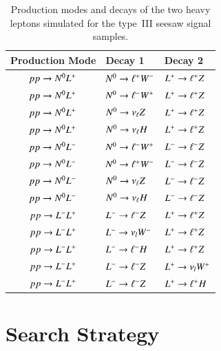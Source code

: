 \begin{table}
	\centering
	\begin{tabular}{c|ll}
		Production Mode & Decay 1 & Decay 2 \\
		\hline
		$pp \rightarrow N^{0}L^{+}$	&	$N^{0} \rightarrow \ell^{+} W^{-}$	&	$L^{+} \rightarrow \ell^{+} Z$ \\
		$pp \rightarrow N^{0}L^{+}$	&	$N^{0} \rightarrow \ell^{-} W^{+}$	&	$L^{+} \rightarrow \ell^{+} Z$ \\
		$pp \rightarrow N^{0}L^{+}$	&	$N^{0} \rightarrow \nu_{\ell} Z$		&	$L^{+} \rightarrow \ell^{+} Z$ \\
		$pp \rightarrow N^{0}L^{+}$	&	$N^{0} \rightarrow \nu_{\ell} H$		&	$L^{+} \rightarrow \ell^{+} Z$ \\
		$pp \rightarrow N^{0}L^{-}$	&	$N^{0} \rightarrow \ell^{-} W^{+}$	&	$L^{-} \rightarrow \ell^{-} Z$ \\
		$pp \rightarrow N^{0}L^{-}$	&	$N^{0} \rightarrow \ell^{+} W^{-}$	&	$L^{-} \rightarrow \ell^{-} Z$ \\
		$pp \rightarrow N^{0}L^{-}$	&	$N^{0} \rightarrow \nu_{\ell} Z$		&	$L^{-} \rightarrow \ell^{-} Z$ \\
		$pp \rightarrow N^{0}L^{-}$	&	$N^{0} \rightarrow \nu_{\ell} H$		&	$L^{-} \rightarrow \ell^{-} Z$ \\
		$pp \rightarrow L^{-}L^{+}$	&	$L^{-} \rightarrow \ell^{-} Z$		&	$L^{+} \rightarrow \ell^{+} Z$ \\
		$pp \rightarrow L^{-}L^{+}$	&	$L^{-} \rightarrow \nu_{l} W^{-}$	&	$L^{+} \rightarrow \ell^{+} Z$ \\
		$pp \rightarrow L^{-}L^{+}$	&	$L^{-} \rightarrow \ell^{-} H$		&	$L^{+} \rightarrow \ell^{+} Z$ \\
		$pp \rightarrow L^{-}L^{+}$	&	$L^{-} \rightarrow \ell^{-} Z$		&	$L^{+} \rightarrow \nu_{l} W^{+}$ \\
		$pp \rightarrow L^{-}L^{+}$	&	$L^{-} \rightarrow \ell^{-} Z$		&	$L^{+} \rightarrow \ell^{+} H$ \\
	\end{tabular}
	\caption{Production modes and decays of the two heavy leptons simulated for the type~III seesaw signal samples.}
	\label{table:resonance-seesaw-sample-decays}
\end{table}



\section{Search Strategy}\label{sec:resonance-search-strategy}
